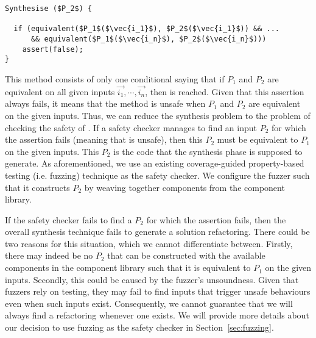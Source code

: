 \documentclass[sigconf,review,anonymous]{acmart}
\begin{document}
\begin{lstlisting}[mathescape=true,showstringspaces=false]
Synthesise ($P_2$) {

  if (equivalent($P_1$($\vec{i_1}$), $P_2$($\vec{i_1}$)) && ...
      && equivalent($P_1$($\vec{i_n}$), $P_2$($\vec{i_n}$)))
    assert(false);
}
\end{lstlisting}

This method consists of only one conditional saying that if $P_1$ and $P_2$ are equivalent on all given inputs $\vec{i_1}, \cdots, \vec{i_n}$, then  is reached.
Given that this assertion always fails, it means that the method is unsafe when $P_1$ and $P_2$ are equivalent on the given inputs.
Thus, we can reduce the synthesis problem to the problem of checking the safety of . If a safety checker manages to
find an input $P_2$ for which the assertion fails (meaning that  is unsafe), then this $P_2$ must be equivalent to $P_1$ on the given inputs. This $P_2$ is the code
that the synthesis phase is supposed to generate. As aforementioned, we use an existing coverage-guided property-based testing (i.e. fuzzing) technique
as the safety checker. We configure the fuzzer such that it constructs $P_2$ by weaving together components from the component library.

If the safety checker fails to find a $P_2$ for which the assertion fails, then the overall synthesis technique fails to generate a solution refactoring.
There could be two reasons for this situation, which we cannot differentiate between.
Firstly, there may indeed be no $P_2$ that can be constructed with the available components in the component library such that
it is equivalent to $P_1$ on the given inputs. Secondly, this could be caused by the fuzzer's unsoundness.
Given that fuzzers rely on testing, they may fail to find inputs that trigger unsafe behaviours even when such inputs exist.
Consequently, we cannot guarantee that we will always find a refactoring whenever one exists. We will provide more details about our decision to use fuzzing as the safety checker in 
Section~\ref{sec:fuzzing}.


\end{document}
